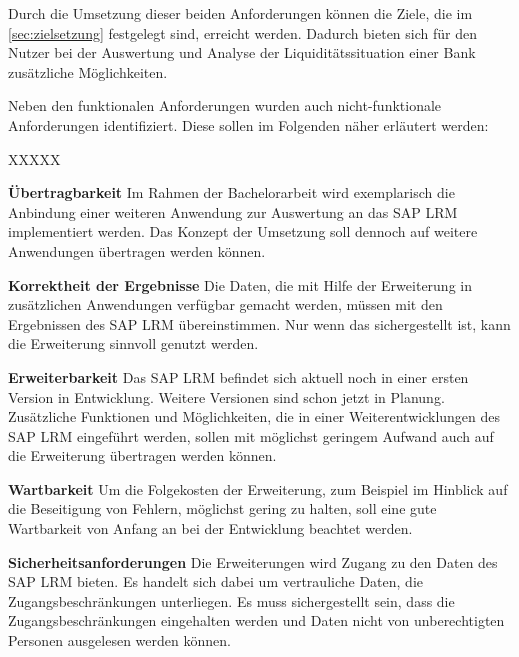 \begin{onehalfspacing}
Durch die Umsetzung dieser beiden  Anforderungen können die Ziele, die im \vref{sec:zielsetzung} festgelegt sind, erreicht werden. Dadurch bieten sich für den Nutzer bei der Auswertung und Analyse der Liquiditätssituation einer Bank zusätzliche Möglichkeiten.

Neben den funktionalen Anforderungen wurden auch nicht-funktionale Anforderungen identifiziert. Diese sollen im Folgenden näher erläutert werden:

\begin{seToplist}{ XXXXX }

\item[\anfl{uebertragbarkeit}] \textbf{Übertragbarkeit} \newline
Im Rahmen der Bachelorarbeit wird exemplarisch die Anbindung einer weiteren Anwendung zur Auswertung an das SAP LRM implementiert werden. Das Konzept der Umsetzung soll dennoch auf weitere Anwendungen übertragen werden können.

\item[\anfl{korrektheit}] \textbf{Korrektheit der Ergebnisse} \newline
Die Daten, die mit Hilfe der Erweiterung in zusätzlichen Anwendungen verfügbar gemacht werden, müssen mit den Ergebnissen des SAP LRM übereinstimmen. Nur wenn das sichergestellt ist, kann die Erweiterung sinnvoll genutzt werden.

\item[\anfl{erweiterbarkeit}] \textbf{Erweiterbarkeit} \newline
Das SAP LRM befindet sich aktuell noch in einer ersten Version in Entwicklung. Weitere Versionen sind schon jetzt in Planung. Zusätzliche Funktionen und Möglichkeiten, die in einer Weiterentwicklungen des SAP LRM eingeführt werden, sollen mit möglichst geringem Aufwand auch auf die Erweiterung übertragen werden können.

\item[\anfl{wartbarkeit}] \textbf{Wartbarkeit} \newline
Um die Folgekosten der Erweiterung, zum Beispiel im Hinblick auf die Beseitigung von Fehlern, möglichst gering zu halten, soll eine gute Wartbarkeit von Anfang an bei der Entwicklung beachtet werden.

\item[\anfl{sicherheit}] \textbf{Sicherheitsanforderungen} \newline
Die Erweiterungen wird Zugang zu den Daten des SAP LRM bieten. Es handelt sich dabei um vertrauliche Daten, die  Zugangsbeschränkungen unterliegen. Es muss sichergestellt sein, dass die Zugangsbeschränkungen eingehalten werden und Daten nicht von unberechtigten Personen ausgelesen werden können.


\end{seToplist}
\end{onehalfspacing}
